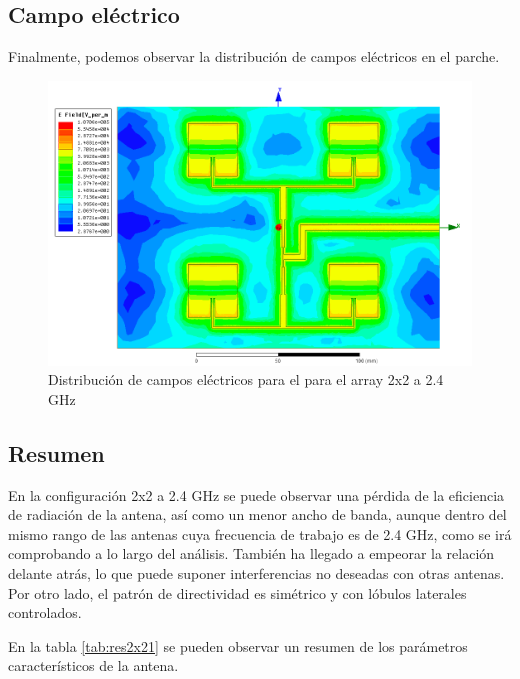 \subsection{Campo eléctrico}
\par Finalmente, podemos observar la distribución de campos eléctricos en el parche. 

\begin{figure}[H]
    \centering
        \includegraphics[width=\textwidth]{archivos/analisis/2x21/8}
        \caption{Distribución de campos eléctricos para el para el array 2x2 a 2.4 GHz}
        \label{fig:elec2x21}
\end{figure}

\subsection{Resumen}
\par En la configuración 2x2 a 2.4 GHz se puede observar una pérdida de la eficiencia de radiación de la antena, así como un menor ancho de banda, aunque dentro del mismo rango de las antenas cuya frecuencia de trabajo es de 2.4 GHz, como se irá comprobando a lo largo del análisis. También ha llegado a empeorar la relación delante atrás, lo que puede suponer interferencias no deseadas con otras antenas. Por otro lado, el patrón de directividad es simétrico y con lóbulos laterales controlados.
\\
\par En la tabla \ref{tab:res2x21} se pueden observar un resumen de los parámetros característicos de la antena.

